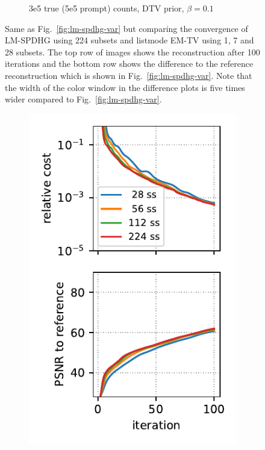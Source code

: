 \begin{figure}
\begin{subfigure}[]{1.0\textwidth}
    \caption{3e5 true (5e5 prompt) counts, DTV prior, $\beta = 0.1$}
  \end{subfigure}
  \caption{Same as Fig.~\ref{fig:lm-spdhg-var} but comparing the convergence of LM-SPDHG using
           224 subsets and listmode EM-TV using 1, 7 and 28 subsets.
           The top row of images shows the reconstruction after 100 iterations and the bottom
           row shows the difference to the reference reconstruction which is shown in
           Fig.~\ref{fig:lm-spdhg-var}.
           Note that the width of the color window in the difference plots is five times wider
           compared to Fig.~\ref{fig:lm-spdhg-var}.}
  \label{fig:emtv}
\end{figure}


\begin{figure}
  \centering
  \begin{subfigure}[b]{0.23\textwidth}
    \centering
    \includegraphics[width=1.0\textwidth]{./figs/brain2d_counts_3.0E+05_seed_1_beta_3.0E-02_prior_TV_niter_ref_20000_fwhm_4.5_4.5_niter_100_ss.pdf}

\end{subfigure}
\end{figure}
